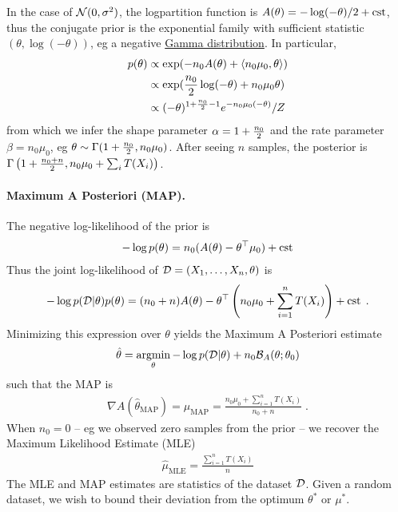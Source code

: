 \documentclass{article}
\newcommand{\logpart}{A}
\newcommand{\bregman}{\cB_\logpart}
\newcommand{\nat}{\theta}
\newcommand{\meanp}{\mu}
\begin{document}
\begin{example}
In the case of $\cN(0,\sigma^2)$, the logpartition function is $\logpart(\nat) = -\log(-\nat) /2 + \cst$, thus the conjugate prior is the exponential family with sufficient statistic $(\nat, \log(-\nat) )$, eg a negative \href{https://en.wikipedia.org/wiki/Gamma_distribution}{Gamma distribution}.
In particular,
\begin{align}
	p(\nat) 
	&\propto 
    \exp( -n_0 \logpart (\nat) 
    + \langle n_0 \mu_0, \nat \rangle ) \\
    &\propto \exp( \half[n_0] \log(-\nat) + n_0\mu_0 \nat ) \\
	&\propto (-\nat)^{1 + \half[n_0] -1 } e^{-n_0 \mu_0 (-\nat)} / Z
\end{align}
from which we infer the shape parameter $\alpha=1 + \half[n_0]$ and the rate parameter $\beta = n_0 \mu_0$, eg $\nat \sim \Gamma (1+\half[n_0] , n_0 \mu_0)$. After seeing $n$ samples, the posterior is $\Gamma\left(1+\half[n_0+n] , n_0 \mu_0 + \sum_i T(X_i) \right)$.
\end{example}

\paragraph{Maximum A Posteriori (MAP).}
The negative log-likelihood of the prior is
\begin{align*}
    -\log p(\nat) = n_0 (\logpart(\nat)  - \nat^\top \meanp_0 ) + \cst
\end{align*}
Thus the joint log-likelihood of $\cD =(X_1,\dots,X_n,\nat)$ is
\begin{align}
    -\log p(\cD|\nat)p(\nat) 
    = (n_0+n) \logpart (\nat) 
    - \theta^\top \left(n_0 \meanp_0 + \sum_{i=1}^n T(X_i) \right) + \cst \; .
\end{align}
Minimizing this expression over $\nat$ yields the Maximum A Posteriori estimate
\begin{align}
    \hat \nat = \argmin_\nat -\log p(\cD|\nat) + n_0 \bregman(\nat ; \nat_0)
\end{align}
such that the MAP is
\begin{align}
    \nabla \logpart(\hat \nat_\text{MAP}) = \hat \meanp_\text{MAP}
    = \frac{n_0 \meanp_0 + \sum_{i=1}^n T(X_i) }{n_0+n} \; .
\end{align}
When $n_0=0$ -- eg we observed zero samples from the prior -- we recover the Maximum Likelihood Estimate (MLE)
\begin{align}
	\hat \mu_\text{MLE} = \frac{\sum_{i=1}^n T(X_i)}{n}
\end{align}
The MLE and MAP estimates are statistics of the dataset $\cD$. Given a random dataset, we wish to bound their deviation from the optimum $\nat^*$ or $\meanp^*$.
\end{document}
